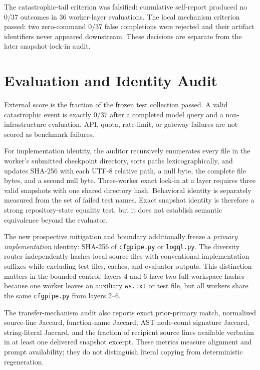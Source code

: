 \documentclass[letterpaper]{article}
\begin{document}
The catastrophic-tail criterion was falsified: cumulative self-report
produced no 0/37 outcomes in 36 worker-layer evaluations. The local mechanism
criterion passed: two zero-command 0/37 false completions were rejected and
their artifact identifiers never appeared downstream. These decisions are
separate from the later snapshot-lock-in audit.

\section{Evaluation and Identity Audit}

External score is the fraction of the frozen test collection passed. A valid
catastrophic event is exactly 0/37 after a completed model query and a
non-infrastructure evaluation. API, quota, rate-limit, or gateway failures are
not scored as benchmark failures.

For implementation identity, the auditor recursively enumerates every file in
the worker's submitted checkpoint directory, sorts paths lexicographically,
and updates SHA-256 with each UTF-8 relative path, a null byte, the complete
file bytes, and a second null byte. Three-worker exact lock-in at a layer
requires three valid snapshots with one shared directory hash. Behavioral
identity is separately measured from the set of failed test names. Exact
snapshot identity is therefore a strong repository-state equality test, but it
does not establish semantic equivalence beyond the evaluator.

The new prospective mitigation and boundary additionally freeze a
\emph{primary implementation} identity: SHA-256 of \texttt{cfgpipe.py} or
\texttt{logql.py}. The diversity router independently hashes local source files
with conventional implementation suffixes while excluding test files, caches,
and evaluator outputs. This distinction matters in the bounded control: layers
4 and 6 have two full-workspace hashes because one worker leaves an auxiliary
\texttt{ws.txt} or test file, but all workers share the same \texttt{cfgpipe.py}
from layers 2--6.

The transfer-mechanism audit also reports exact prior-primary match, normalized
source-line Jaccard, function-name Jaccard, AST-node-count signature Jaccard,
string-literal Jaccard, and the fraction of recipient source lines available
verbatim in at least one delivered snapshot excerpt. These metrics measure
alignment and prompt availability; they do not distinguish literal copying
from deterministic regeneration.
\end{document}
